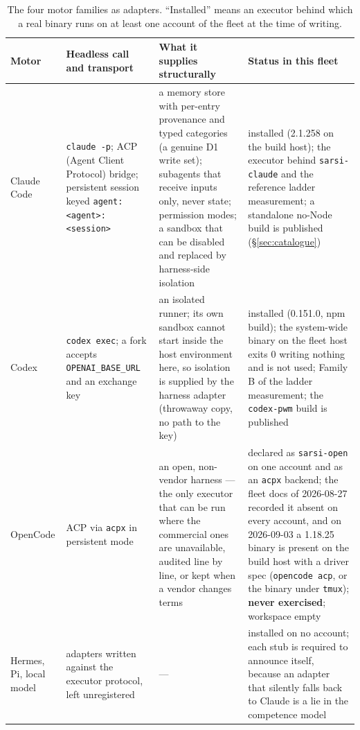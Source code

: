 \begin{table}[H]
\centering\small
\begin{tabularx}{\textwidth}{@{}lYYY@{}}
\toprule
Motor & Headless call and transport & What it supplies structurally & Status in this fleet \\
\midrule
Claude Code & \texttt{claude -p}; ACP (Agent Client Protocol) bridge; persistent session keyed \texttt{agent:}\allowbreak\texttt{<agent>:}\allowbreak\texttt{<session>} & a memory store with per-entry provenance and typed categories (a genuine D1 write set); subagents that receive inputs only, never state; permission modes; a sandbox that can be disabled and replaced by harness-side isolation & installed (2.1.258 on the build host); the executor behind \texttt{sarsi-claude} and the reference ladder measurement; a standalone no-Node build is published (\S\ref{sec:catalogue}) \\
Codex & \texttt{codex exec}; a fork accepts \texttt{OPENAI\_BASE\_URL} and an exchange key & an isolated runner; its own sandbox cannot start inside the host environment here, so isolation is supplied by the harness adapter (throwaway copy, no path to the key) & installed (0.151.0, npm build); the system-wide binary on the fleet host exits 0 writing nothing and is not used; Family B of the ladder measurement; the \texttt{codex-pwm} build is published \\
OpenCode & ACP via \texttt{acpx} in persistent mode & an open, non-vendor harness --- the only executor that can be run where the commercial ones are unavailable, audited line by line, or kept when a vendor changes terms & declared as \texttt{sarsi-open} on one account and as an \texttt{acpx} backend; the fleet docs of 2026-08-27 recorded it absent on every account, and on 2026-09-03 a 1.18.25 binary is present on the build host with a driver spec (\texttt{opencode acp}, or the binary under \texttt{tmux}); \textbf{never exercised}; workspace empty \\
Hermes, Pi, local model & adapters written against the executor protocol, left unregistered & --- & installed on no account; each stub is required to announce itself, because an adapter that silently falls back to Claude is a lie in the competence model \\
\bottomrule
\end{tabularx}
\caption{The four motor families as adapters. ``Installed'' means an executor behind which a real binary runs on at least one account of the fleet at the time of writing.}
\label{tab:motors}
\end{table}

